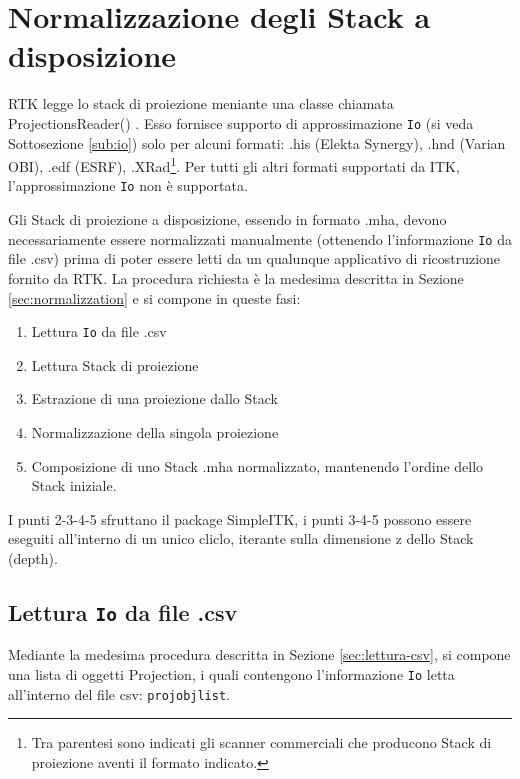\documentclass[a4paper,12pt, doubleside]{report}
\begin{document}
        \section{Normalizzazione degli Stack a disposizione}
            \label{sec:norm-disp}
            \par
                RTK legge lo stack di proiezione meniante una classe chiamata ProjectionsReader() \cite{projections-reader}. Esso fornisce supporto di approssimazione \texttt{Io} (si veda Sottosezione \ref{sub:io}) solo per alcuni formati: .his (Elekta Synergy), .hnd (Varian OBI), .edf (ESRF), .XRad\footnote{Tra parentesi sono indicati gli scanner commerciali che producono Stack di proiezione aventi il formato indicato.}. Per tutti gli altri formati supportati da ITK, l'approssimazione \texttt{Io} non è supportata.
            \par    
                Gli Stack di proiezione a disposizione, essendo in formato .mha, devono necessariamente essere normalizzati manualmente (ottenendo l'informazione \texttt{Io} da file .csv) prima di poter essere letti da un qualunque applicativo di ricostruzione fornito da RTK.
                La procedura richiesta è la medesima descritta in Sezione \ref{sec:normalizzation} e si compone in queste fasi:
                \begin{enumerate}
                    \item Lettura \texttt{Io} da file .csv
                    \item Lettura Stack di proiezione
                    \item Estrazione di una proiezione dallo Stack
                    \item Normalizzazione della singola proiezione
                    \item Composizione di uno Stack .mha normalizzato, mantenendo l'ordine dello Stack iniziale.
                \end{enumerate}
                
                I punti 2-3-4-5 sfruttano il package SimpleITK, i punti 3-4-5 possono essere eseguiti all'interno di un unico cliclo, iterante sulla dimensione z dello Stack (depth).
                
            \subsection{Lettura \texttt{Io} da file .csv}
                \par
                    Mediante la medesima procedura descritta in Sezione \ref{sec:lettura-csv}, si compone una lista di oggetti Projection, i quali contengono l'informazione \texttt{Io} letta all'interno del file csv: \texttt{proj\textunderscore obj\textunderscore list}.
                
\end{document}

